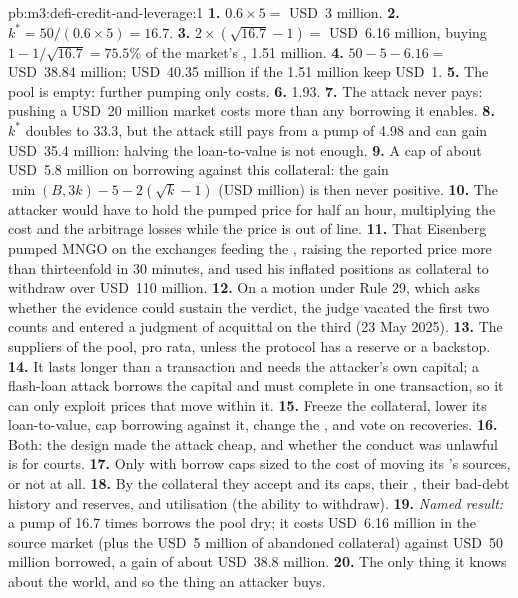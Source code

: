 \begin{solution}{pb:m3:defi-credit-and-leverage:1}
\textbf{1.} $0.6 \times 5 = $ USD~3 million. \textbf{2.} $k^* = 50/(0.6 \times 5) = 16.7$. \textbf{3.} $2 \times (\sqrt{16.7} - 1) = $ USD~6.16
million, buying $1 - 1/\sqrt{16.7} = 75.5\%$ of the market's , 1.51 million. \textbf{4.} $50 - 5 - 6.16 = $ USD~38.84 million; USD~40.35
million if the 1.51 million  keep USD~1. \textbf{5.} The pool is empty: further pumping only costs. \textbf{6.} 1.93. \textbf{7.} The attack
never pays: pushing a USD~20 million market costs more than any borrowing it enables. \textbf{8.} $k^*$ doubles to 33.3, but the attack still pays
from a pump of 4.98 and can gain USD~35.4 million: halving the loan-to-value is not enough. \textbf{9.} A cap of about USD~5.8 million on borrowing
against this collateral: the gain $\min(B, 3k) - 5 - 2(\sqrt{k} - 1)$ (USD million) is then never positive. \textbf{10.} The attacker would have to hold
the pumped price for half an hour, multiplying the cost and the arbitrage losses while the price is out of line. \textbf{11.} That Eisenberg pumped MNGO
on the exchanges feeding the , raising the reported price more than thirteenfold in 30 minutes, and used his inflated positions as collateral to
withdraw over USD~110 million. \textbf{12.} On a motion under Rule 29, which asks whether the evidence could sustain the verdict, the
judge vacated the first two counts and entered a judgment of acquittal on the third (23 May 2025). \textbf{13.} The suppliers of the pool, pro rata, unless the
protocol has a reserve or a backstop. \textbf{14.} It lasts longer than a transaction and needs the attacker's own capital; a flash-loan attack borrows
the capital and must complete in one transaction, so it can only exploit prices that move within it. \textbf{15.} Freeze the collateral, lower its
loan-to-value, cap borrowing against it, change the , and vote on recoveries. \textbf{16.} Both: the design made the attack cheap, and whether the
conduct was unlawful is for courts. \textbf{17.} Only with borrow caps sized to the cost of moving its 's sources, or not at all. \textbf{18.} By the
collateral they accept and its caps, their , their bad-debt history and reserves, and utilisation (the ability to withdraw). \textbf{19.}
\emph{Named result:} a pump of 16.7 times borrows the pool dry; it costs USD~6.16 million in the source market (plus the USD~5 million of abandoned
collateral) against USD~50 million borrowed, a gain of about USD~38.8 million. \textbf{20.} The only thing it knows about the world, and so the thing an
attacker buys.
\end{solution}

